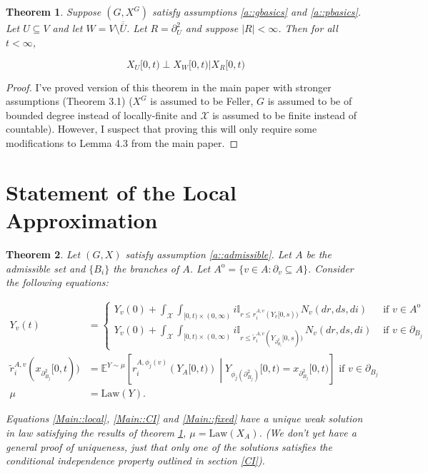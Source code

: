 \documentclass[12pt]{article}
\newcommand{\mb}{\mathbb}
\newcommand{\mc}{\mathcal}
\newcommand{\ov}{\overline}
\newcommand{\te}{\text}
\newcommand{\exmu}[2]{\mb{E}^{#1}\left[#2\right]}	%
\newcommand{\sta}{\mc{X}}							%
\newcommand{\neigh}[1]{\partial_{#1}}				%
\newcommand{\dneigh}[1]{\partial^2_{#1}}			%
\newcommand{\cl}[1]{\ov{#1}}						%
\newcommand{\Xf}{X}									%
\newcommand{\poiss}{N}								%
\newcommand{\rate}{r}								%
\newcommand{\poissv}[1]{_{#1}}						%
\newcommand{\vind}[1]{_{#1}}						%
\newcommand{\tme}[1]{(#1)}							%
\newcommand{\tmi}[1]{#1}							%
\newcommand{\gind}[1]{^{#1}}						%
\newcommand{\stpara}[1]{_{#1}}						%
\newcommand{\gvpara}[2]{^{#1,#2}}					%
\newcommand{\Xg}{Y}									%
\newcommand{\brate}{\alt{\rate}}					%
\newcommand{\inte}[1]{{#1}^\mathrm{o}}				%
\newcommand{\alt}[1]{\tilde{#1}}					%
\newcommand{\law}{\te{Law}}							%
\newtheorem{thms}{Theorem}[section]
\begin{document}
\begin{thms}
Suppose \((G,\Xf\gind{G})\) satisfy assumptions \ref{a::gbasics} and \ref{a::pbasics}. Let \(U \subseteq V\) and let \(W = V\setminus \ov{\ov{U}}\). Let \(R = \dneigh{U}\) and suppose \(|R| < \infty\). Then for all \(t < \infty\),

\begin{equation}
\Xf\vind{U}\tmi{[0,t)}\perp \Xf\vind{W}\tmi{[0,t)}|\Xf\vind{R}\tmi{[0,t)}
\label{CI::CIeqn}
\end{equation}

\label{CI::CI}
\end{thms}
\begin{proof}
I've proved version of this theorem in the main paper with stronger assumptions (Theorem 3.1) (\(\Xf\gind{G}\) is assumed to be Feller, \(G\) is assumed to be of bounded degree instead of locally-finite and \(\sta\) is assumed to be finite instead of countable). However, I suspect that proving this will only require some modifications to Lemma 4.3 from the main paper.
\end{proof}
\section{Statement of the Local Approximation}
\label{Main}


\begin{thms}
Let \((G,\Xf)\) satisfy assumption \ref{a::admissible}. Let \(A\) be the admissible set and \(\{B_i\}\) the branches of \(A\). Let \(\inte{A} = \{v \in A: \neigh{v} \subseteq A\}\). Consider the following equations:

\begin{align}
\Xg\vind{v}\tme{t} &= 
\begin{cases}
\Xg\vind{v}\tme{0} + \int_{\sta} \int_{[0,t)\times (0,\infty)} i\mb{I}_{r\leq \rate\gvpara{A}{v}\stpara{i}(\Xg\vind{\cl{v}}\tmi{[0,s)})}\,\poiss\poissv{v}(dr,ds,di) & \te{ if } v \in \inte{A}\\
\Xg\vind{v}\tme{0} + \int_{\sta} \int_{[0,t)\times (0,\infty)} i\mb{I}_{r\leq \brate\gvpara{A}{v}\stpara{i}(\Xg\vind{\dneigh{B_j}}\tmi{[0,s)})}\,\poiss\poissv{v}(dr,ds,di) &\te{ if } v \in \neigh{B_j}
\end{cases}\label{Main::local}\\
\brate\gvpara{A}{v}\stpara{i}(x_{\dneigh{B_j}}[0,t)) &= \exmu{\Xg \sim \mu}{\rate\gvpara{A}{\phi_j(v)}\stpara{i}\left(\Xg\vind{A}\tmi{[0,t)}\right)\middle|\Xg\vind{\phi_j(\dneigh{B_j})}\tmi{[0,t)} = x\vind{\dneigh{B_j}}\tmi{[0,t)}} \te{ if } v \in \neigh{B_j}\label{Main::CI}\\
\mu &= \law(\Xg).\label{Main::fixed}
\end{align}

Equations \eqref{Main::local}, \eqref{Main::CI} and \eqref{Main::fixed} have a unique weak solution in law satisfying the results of theorem \ref{CI::CI}, \(\mu = \law(\Xf\vind{A})\). (We don't yet have a general proof of uniqueness, just that only one of the solutions satisfies the conditional independence property outlined in section \ref{CI}).
\label{Main::Main}
\end{thms}
\end{document}
